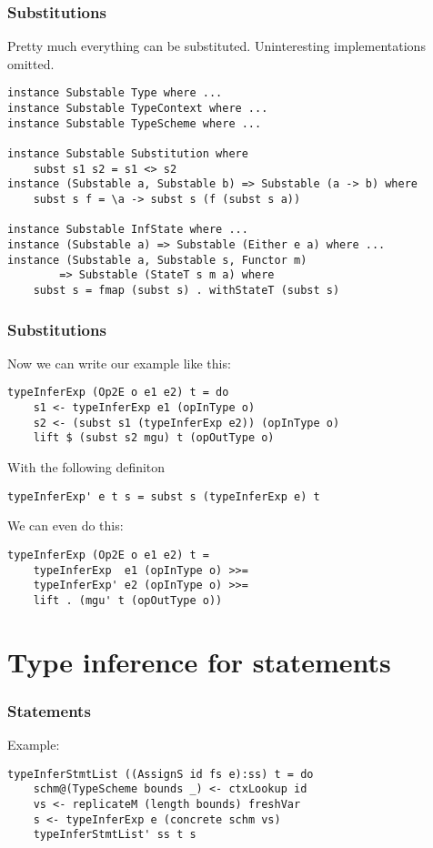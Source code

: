 \documentclass{beamer}
\begin{document}
\begin{frame}[fragile]
\frametitle{Substitutions}

Pretty much everything can be substituted. Uninteresting implementations omitted.

\begin{lstlisting}
instance Substable Type where ...
instance Substable TypeContext where ...
instance Substable TypeScheme where ...

instance Substable Substitution where
    subst s1 s2 = s1 <> s2
instance (Substable a, Substable b) => Substable (a -> b) where
    subst s f = \a -> subst s (f (subst s a))

instance Substable InfState where ...
instance (Substable a) => Substable (Either e a) where ...
instance (Substable a, Substable s, Functor m)
        => Substable (StateT s m a) where
    subst s = fmap (subst s) . withStateT (subst s)
\end{lstlisting}
\end{frame}

\begin{frame}[fragile]
\frametitle{Substitutions}
Now we can write our example like this:
\begin{lstlisting}
typeInferExp (Op2E o e1 e2) t = do
    s1 <- typeInferExp e1 (opInType o)
    s2 <- (subst s1 (typeInferExp e2)) (opInType o)
    lift $ (subst s2 mgu) t (opOutType o)
\end{lstlisting}
With the following definiton
\begin{lstlisting}
typeInferExp' e t s = subst s (typeInferExp e) t
\end{lstlisting}
We can even do this:
\begin{lstlisting}
typeInferExp (Op2E o e1 e2) t =
    typeInferExp  e1 (opInType o) >>=
    typeInferExp' e2 (opInType o) >>=
    lift . (mgu' t (opOutType o))
\end{lstlisting}
\end{frame}

\section{Type inference for statements}

\begin{frame}[fragile]
\frametitle{Statements}
Example:
\begin{lstlisting}
typeInferStmtList ((AssignS id fs e):ss) t = do
    schm@(TypeScheme bounds _) <- ctxLookup id
    vs <- replicateM (length bounds) freshVar
    s <- typeInferExp e (concrete schm vs)
    typeInferStmtList' ss t s
\end{lstlisting}
\end{frame}
\end{document}
